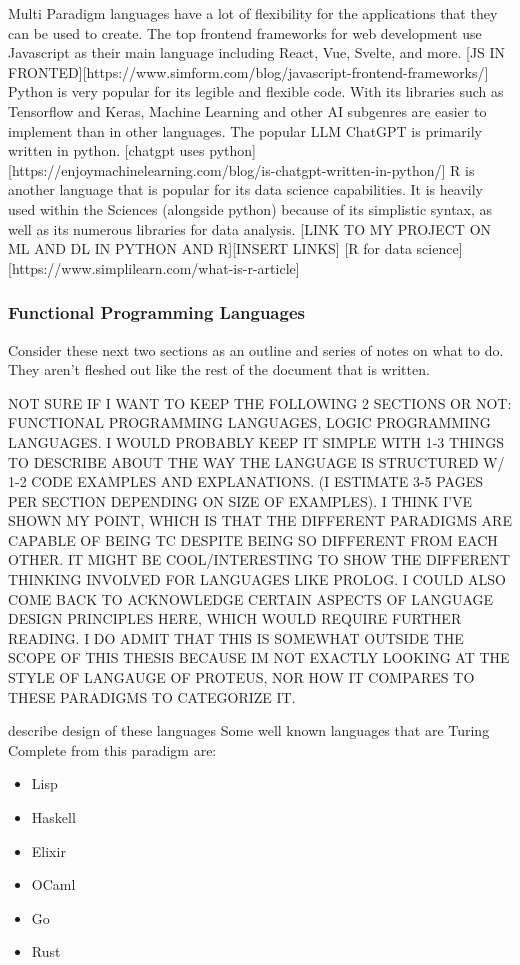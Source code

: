 Multi Paradigm languages have a lot of flexibility for the applications that they can be used to create.
The top frontend frameworks for web development use Javascript as their main language including React, Vue, Svelte, and more.
[JS IN FRONTED][https://www.simform.com/blog/javascript-frontend-frameworks/]
Python is very popular for its legible and flexible code.
With its libraries such as Tensorflow and Keras, Machine Learning and other AI subgenres are easier to implement than in other languages.
The popular LLM ChatGPT is primarily written in python.
[chatgpt uses python][https://enjoymachinelearning.com/blog/is-chatgpt-written-in-python/]
R is another language that is popular for its data science capabilities.
It is heavily used within the Sciences (alongside python) because of its simplistic syntax, as well as its numerous libraries for data analysis.
[LINK TO MY PROJECT ON ML AND DL IN PYTHON AND R][INSERT LINKS]
[R for data science][https://www.simplilearn.com/what-is-r-article]



\subsubsection{Functional Programming Languages}

Consider these next two sections as an outline and series of notes on what to do.
They aren't fleshed out like the rest of the document that is written.

NOT SURE IF I WANT TO KEEP THE FOLLOWING 2 SECTIONS OR NOT: FUNCTIONAL PROGRAMMING LANGUAGES, LOGIC PROGRAMMING LANGUAGES.
I WOULD PROBABLY KEEP IT SIMPLE WITH 1-3 THINGS TO DESCRIBE ABOUT THE WAY THE LANGUAGE IS STRUCTURED W/ 1-2 CODE EXAMPLES AND EXPLANATIONS.
(I ESTIMATE 3-5 PAGES PER SECTION DEPENDING ON SIZE OF EXAMPLES).
I THINK I'VE SHOWN MY POINT, WHICH IS THAT THE DIFFERENT PARADIGMS ARE CAPABLE OF BEING TC DESPITE BEING SO DIFFERENT FROM EACH OTHER.
IT MIGHT BE COOL/INTERESTING TO SHOW THE DIFFERENT THINKING INVOLVED FOR LANGUAGES LIKE PROLOG.
I COULD ALSO COME BACK TO ACKNOWLEDGE CERTAIN ASPECTS OF LANGUAGE DESIGN PRINCIPLES HERE, WHICH WOULD REQUIRE FURTHER READING.
I DO ADMIT THAT THIS IS SOMEWHAT OUTSIDE THE SCOPE OF THIS THESIS BECAUSE IM NOT EXACTLY LOOKING AT THE STYLE OF LANGAUGE OF PROTEUS, NOR HOW IT COMPARES TO THESE PARADIGMS TO CATEGORIZE IT.

describe design of these languages
Some well known languages that are Turing Complete from this paradigm are:  
\begin{itemize}
    \item Lisp
    \item Haskell
    \item Elixir
    \item OCaml
    \item Go
    \item Rust
\end{itemize}

